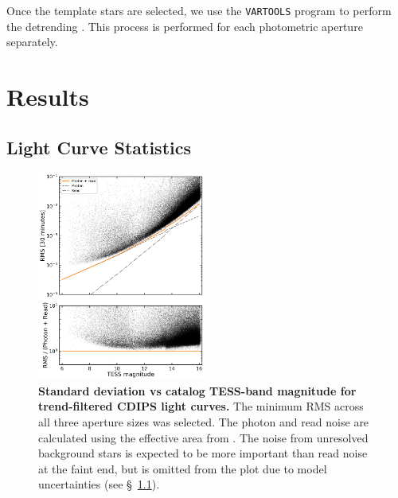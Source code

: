 \documentclass[12pt,twocolumn,tighten]{aastex62}
\begin{document}
Once the template stars are selected, we use the \texttt{VARTOOLS}
program to perform the detrending \citep{Hartman_Bakos_2016}.
This process is performed for each photometric aperture
separately.


\section{Results}
\label{sec:results}

\subsection{Light Curve Statistics}
\label{subsec:lcstatistics}

\begin{figure}[t]
	\begin{center}
		\leavevmode
		\includegraphics[width=0.49\textwidth]{rms_vs_mag.png}
	\end{center}
	\vspace{-0.5cm}
  \caption{ {\bf Standard deviation vs catalog TESS-band magnitude for
  trend-filtered CDIPS light curves.} The minimum RMS across all three
  aperture sizes was selected.  The photon and read noise are
  calculated using the effective area from \citet{vanderspek_2018}.
  The noise from unresolved background stars is expected to be more
  important than read noise at the faint end, but is omitted from the
  plot due to model uncertainties (see \S~\ref{subsec:lcstatistics}).
		\label{fig:rms_vs_mag}
	}
\end{figure}
\end{document}
